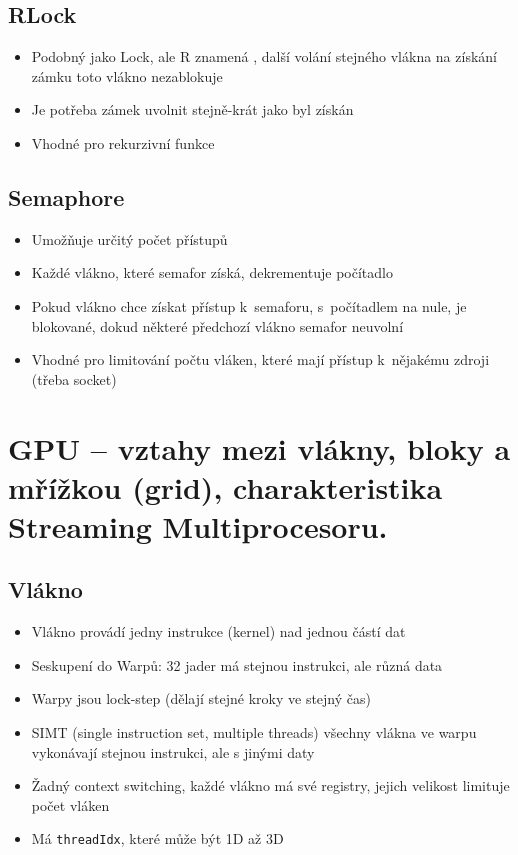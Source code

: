 \subsection{RLock}
\begin{itemize}
    \item Podobný jako Lock, ale R znamená , další volání stejného vlákna na získání zámku toto vlákno nezablokuje
    \item Je potřeba zámek uvolnit stejně-krát jako byl získán
    \item Vhodné pro rekurzivní funkce
\end{itemize}

\subsection{Semaphore}
\begin{itemize}
    \item Umožňuje určitý počet přístupů
    \item Každé vlákno, které semafor získá, dekrementuje počítadlo
    \item Pokud vlákno chce získat přístup k~semaforu, s~počítadlem na nule, je blokované, dokud některé předchozí vlákno semafor neuvolní
    \item Vhodné pro limitování  počtu vláken, které mají přístup k~nějakému zdroji (třeba socket)
\end{itemize}


\section{GPU – vztahy mezi vlákny, bloky a mřížkou (grid), charakteristika Streaming Multiprocesoru.}
\subsection{Vlákno}
\begin{itemize}
    \item Vlákno provádí jedny instrukce (kernel) nad jednou částí dat
    \item Seskupení do Warpů: 32 jader má stejnou instrukci, ale různá data
    \item Warpy jsou lock-step (dělají stejné kroky ve stejný čas)
    \item SIMT (single instruction set, multiple threads) všechny vlákna ve warpu vykonávají stejnou instrukci, ale s jinými daty
    \item Žadný context switching, každé vlákno má své registry, jejich velikost limituje počet vláken
    \item Má \texttt{threadIdx}, které může být 1D až 3D
\end{itemize}

